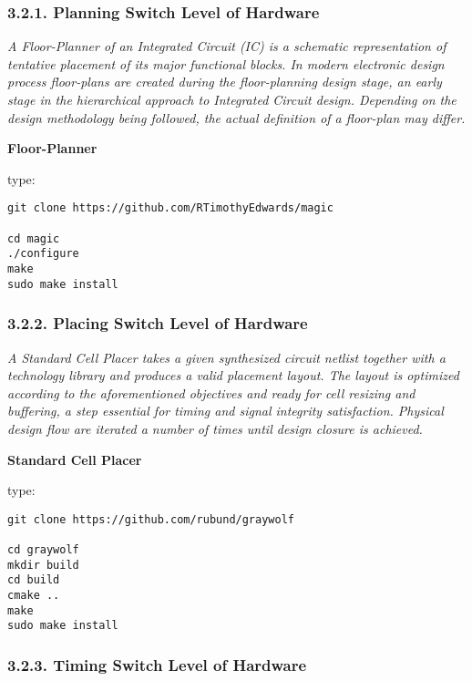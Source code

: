 \documentclass[]{article}
\begin{document}
\subsubsection{3.2.1. Planning Switch Level of
Hardware}\label{planning-switch-level-of-hardware}

\emph{A Floor-Planner of an Integrated Circuit (IC) is a schematic
representation of tentative placement of its major functional blocks. In
modern electronic design process floor-plans are created during the
floor-planning design stage, an early stage in the hierarchical approach
to Integrated Circuit design. Depending on the design methodology being
followed, the actual definition of a floor-plan may differ.}

\textbf{Floor-Planner}

type:

\begin{verbatim}
git clone https://github.com/RTimothyEdwards/magic

cd magic
./configure
make
sudo make install
\end{verbatim}

\subsubsection{3.2.2. Placing Switch Level of
Hardware}\label{placing-switch-level-of-hardware}

\emph{A Standard Cell Placer takes a given synthesized circuit netlist
together with a technology library and produces a valid placement
layout. The layout is optimized according to the aforementioned
objectives and ready for cell resizing and buffering, a step essential
for timing and signal integrity satisfaction. Physical design flow are
iterated a number of times until design closure is achieved.}

\textbf{Standard Cell Placer}

type:

\begin{verbatim}
git clone https://github.com/rubund/graywolf

cd graywolf
mkdir build
cd build
cmake ..
make
sudo make install
\end{verbatim}

\subsubsection{3.2.3. Timing Switch Level of
Hardware}\label{timing-switch-level-of-hardware}
\end{document}
